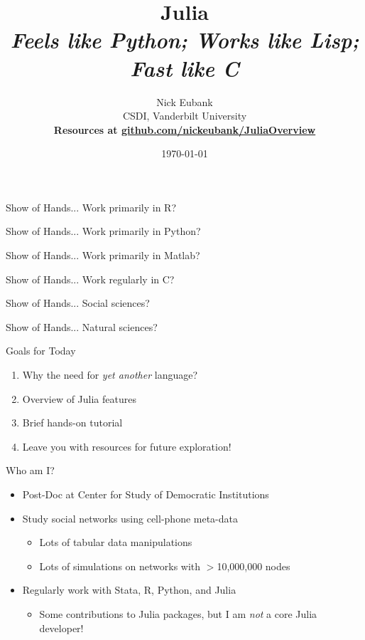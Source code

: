 \documentclass[11pt]{beamer}
\title{Julia \\ \emph{Feels like Python; Works like Lisp; Fast like C}}
\author{	\small Nick Eubank \\
			\scriptsize{CSDI, Vanderbilt University}\vspace*{.15in} \\
            {\normalsize \textbf{Resources at \url{github.com/nickeubank/JuliaOverview}}}}
\date{\vspace*{.3in} \today}
\begin{document}
\begin{frame}
	\maketitle
\end{frame}

\begin{frame}[c]{Show of Hands...}
    \large
    Work primarily in R?
\end{frame}
\begin{frame}[c]{Show of Hands...}
    \large
    Work primarily in Python?
\end{frame}
\begin{frame}[c]{Show of Hands...}
    \large
    Work primarily in Matlab?
\end{frame}
\begin{frame}[c]{Show of Hands...}
    \large
    Work regularly in C?
\end{frame}

\begin{frame}[c]{Show of Hands...}
    \large
    Social sciences?
\end{frame}

\begin{frame}[c]{Show of Hands...}
    \large
    Natural sciences?
\end{frame}



\begin{frame}[c]{Goals for Today}
    \begin{enumerate}
        \item Why the need for \emph{yet another} language?
        \item Overview of Julia features
        \item Brief hands-on tutorial
        \item Leave you with resources for future exploration!
    \end{enumerate}
\end{frame}

\begin{frame}[c]{Who am I?}
\begin{itemize}
    \item Post-Doc at Center for Study of Democratic Institutions
    \item Study social networks using cell-phone meta-data
    \begin{itemize}
        \item Lots of tabular data manipulations
        \item Lots of simulations on networks with $>$10,000,000 nodes
    \end{itemize}
    \item Regularly work with Stata, R, Python, and Julia
    \begin{itemize}
        \item Some contributions to Julia packages, but I am \emph{not} a core Julia developer!
    \end{itemize}
\end{itemize}
\end{frame}
\end{document}
